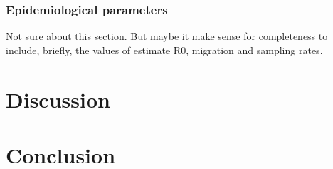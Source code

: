 \documentclass[12pt,]{article}
\begin{document}
\subsubsection*{Epidemiological parameters}

Not sure about this section. But maybe it make sense for completeness to include, briefly, the values of estimate R0, migration and sampling rates.




\section*{Discussion}

\section*{Conclusion}
\end{document}
